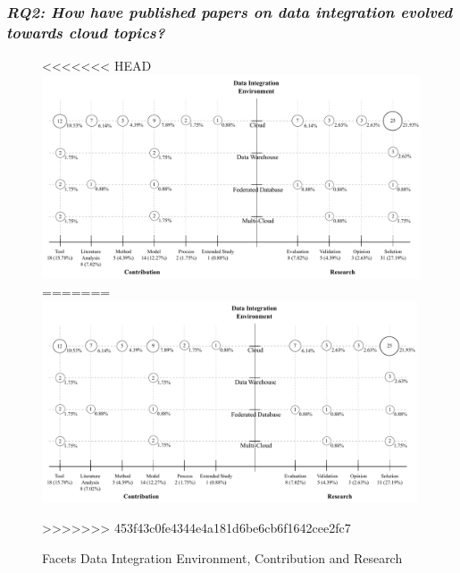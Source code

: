 \subsubsection{\textit{RQ2: How have published papers on data integration evolved towards cloud topics?}}
\begin{figure}[h]
\centering
<<<<<<< HEAD
\includegraphics[scale=0.40]{figs/bubble-charts/DI-Environment-Contribution-Research.pdf}
=======
\includegraphics[width=0.99\textwidth]{figs/bubble-charts/DI-Environment-Contribution-Research.pdf}

>>>>>>> 453f43c0fe4344e4a181d6be6cb6f1642cee2fc7
\caption{Facets Data Integration Environment, Contribution and Research}\label{fig:facet2}
\end{figure}

